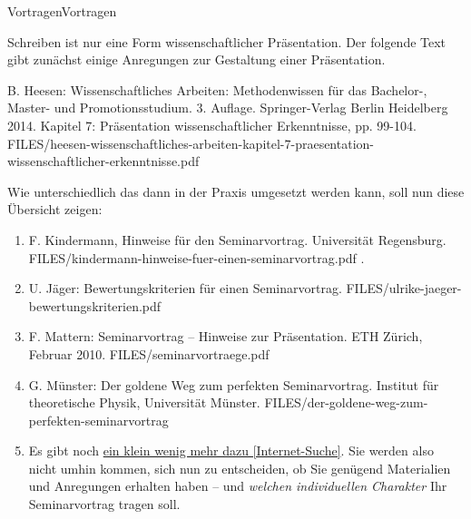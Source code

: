 


\unit{Vortragen}{Vortragen}

\label{vortragen}

Schreiben ist nur eine Form wissenschaftlicher Präsentation.
Der folgende Text gibt zunächst einige Anregungen zur Gestaltung einer Präsentation.

{B. Heesen: Wissenschaftliches Arbeiten: Methodenwissen für das \mbox{Bachelor-,} Master- und Promotionsstudium.
3. Auflage. Springer-Verlag Berlin Heidelberg 2014. 
Kapitel 7: Präsentation wissenschaftlicher Erkenntnisse,
pp. 99-104.}
{FILES/heesen-wissenschaftliches-arbeiten-kapitel-7-praesentation-wissenschaftlicher-erkenntnisse.pdf}
{}


Wie unterschiedlich das dann in der Praxis umgesetzt werden kann, soll nun diese
Übersicht zeigen:

\begin{enumerate}
\item {}
{F. Kindermann, Hinweise für den Seminarvortrag. Universität Regensburg.}
{FILES/kindermann-hinweise-fuer-einen-seminarvortrag.pdf}
{\href{https://www.uni-regensburg.de/assets/wirtschaftswissenschaften/vwl-kindermann/resources/hinweise_vortrag.pdf}{\online}}
.

\item {}
{U. Jäger: Bewertungskriterien für einen Seminarvortrag.}
{FILES/ulrike-jaeger-bewertungskriterien.pdf}
{\href{https://www.informatik.hu-berlin.de/de/forschung/gebiete/sam/Lehre/proseminar-sysml/material/bewertungskriterien-fur-einen-seminarvortrag}{\online}}

\item {}
{F. Mattern: Seminarvortrag -- Hinweise zur Prä\-sen\-ta\-tion.
ETH Zürich, Februar 2010.}
{FILES/seminarvortraege.pdf}
{}

\item {}
{G. Münster: Der goldene Weg zum perfekten Seminarvortrag. Institut für theoretische Physik,
Universität Münster.}
{FILES/der-goldene-weg-zum-perfekten-seminarvortrag}
{\href{https://www.uni-muenster.de/Physik.TP/archive/Seminare/anleitung.html}{\online}}

\item Es gibt noch \href{https://duckduckgo.com/?q=Wie+halte+ich+einen+Seminarvortrag&ia=web}{ein klein wenig mehr dazu [Internet-Suche]}.
Sie werden also nicht umhin kommen, sich nun zu entscheiden, ob Sie genügend Materialien und
Anregungen erhalten haben -- und \textit{welchen individuellen
Charakter} Ihr Seminarvortrag tragen soll.
\end{enumerate}

